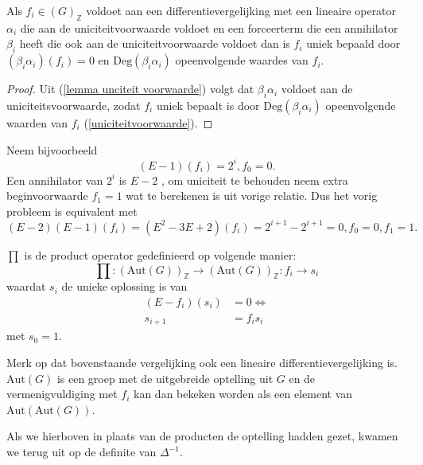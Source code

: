 \documentclass[a4paper,12pt]{article}
\begin{document}
\begin{theorem}
    \label{annihilator}
    Als $f_i \in (G)_{\mathbb{Z}}$ voldoet aan een differentievergelijking met een lineaire operator $\alpha_i$
    die aan de uniciteitvoorwaarde voldoet en een forceerterm die een annihilator $\beta_i$ heeft
    die ook aan de uniciteitvoorwaarde voldoet dan
    is $f_i$ uniek bepaald door
    $
        (\beta_i\alpha_i)(f_i) = 0
    $
    en $\text{Deg}(\beta_i\alpha_i)$ opeenvolgende waardes van $f_i$.
\end{theorem}

\begin{proof}
    Uit (\ref{lemma unciteit voorwaarde}) volgt dat $\beta_i\alpha_i$ voldoet aan de uniciteitsvoorwaarde, zodat $f_i$ uniek bepaalt is door $\text{Deg}(\beta_i\alpha_i)$ opeenvolgende waarden van $f_i$
    (\ref{uniciteitvoorwaarde}).
\end{proof}

\begin{example}
    Neem bijvoorbeeld
    $$
        (E-1)(f_i) = 2^i , f_0 =0.
    $$
    Een annihilator van $2^i$ is $E-2$ , om uniciteit te behouden neem extra beginvoorwaarde $f_1 = 1$ wat te
    berekenen is uit vorige relatie. Dus het vorig probleem is equivalent met
    $$
        (E-2)(E-1)(f_i)= (E^2-3E+2)(f_i) = 2^{i+1}-2^{i+1}=0, f_0 =0, f_1=1.
    $$
\end{example}

\begin{definition}[$\prod$]
    $\prod$ is de product operator gedefinieerd op volgende manier:
    $$
        \prod:(\text{Aut}(G))_\mathbb{Z} \rightarrow(\text{Aut}(G))_\mathbb{Z}: f_i \rightarrow s_i
    $$
    waardat $s_i$ de unieke oplossing is van
    \begin{align*}
        (E-f_i)(s_i) & = 0 \Leftrightarrow \\
        s_{i+1}      & = f_i s_i
    \end{align*}
    met $s_0 = 1$.
\end{definition}

\begin{remark}
    Merk op dat bovenstaande vergelijking ook een lineaire differentievergelijking is. $\text{Aut}(G)$
    is een groep met de uitgebreide optelling uit $G$ en de vermenigvuldiging met $f_i$ kan dan bekeken worden
    als een element van $\text{Aut}(\text{Aut}(G))$.
\end{remark}

\begin{remark}
    Als we hierboven in plaats van de producten de optelling hadden gezet, kwamen we terug uit op de definite van
    $\Delta^{-1}$.
\end{remark}
\end{document}
